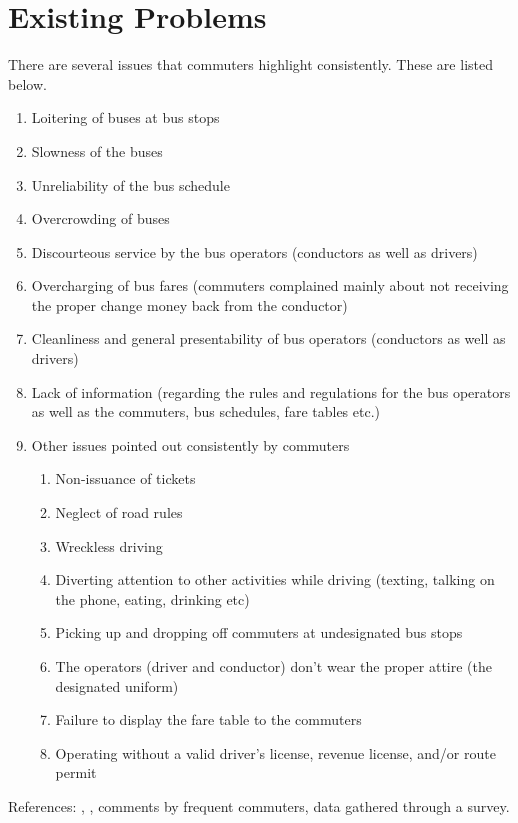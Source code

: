\documentclass[12pt, oneside]{report}
\begin{document}
\section{Existing Problems}
\label{section-ExistingProblems}
There are several issues that commuters highlight consistently. These are listed below. 
\begin {enumerate}
\item Loitering of buses at bus stops
\item Slowness of the buses
\item Unreliability of the bus schedule
\item Overcrowding of buses
\item Discourteous service by the bus operators (conductors as well as drivers)
\item Overcharging of bus fares (commuters complained mainly about not receiving the proper change money back from the conductor)
\item Cleanliness and general presentability of bus operators (conductors as well as drivers)
\item Lack of information (regarding the rules and regulations for the bus operators as well as the commuters, bus schedules, fare tables etc.)
\item Other issues pointed out consistently by commuters
	\begin {enumerate}
	\item Non-issuance of tickets
	\item Neglect of road rules
	\item Wreckless driving
	\item Diverting attention to other activities while driving (texting, talking on the phone, eating, drinking etc)
	\item Picking up and dropping off commuters at undesignated bus stops
	\item The operators (driver and conductor) don't wear the proper attire (the designated uniform)
	\item Failure to display the fare table to the commuters
	\item Operating without a valid driver's license, revenue license, and/or route permit
	\end {enumerate}
\end {enumerate}
References: \citep{Wickremasekara2012}, \citep{Range2012}, comments by frequent commuters, data gathered through a survey.

\newpage
\end{document}
